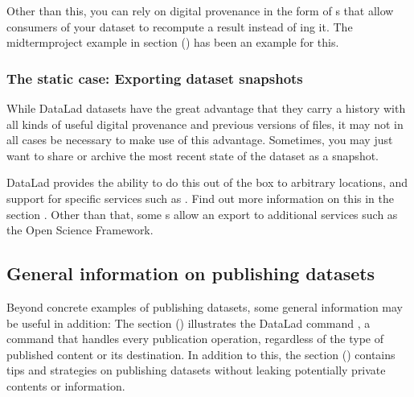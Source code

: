 \sphinxAtStartPar
Other than this, you can rely on digital provenance in the form of {\hyperref[\detokenize{glossary:term-run-record}]{}}s that allow consumers of your dataset to recompute a result instead of ing it.
The midterm\sphinxhyphen{}project example in section {\hyperref[\detokenize{basics/101-130-yodaproject:yoda-project}]{}} () has been an example for this.


\subsubsection{The static case: Exporting dataset snapshots}
\label{\detokenize{basics/101-138-sharethirdparty:the-static-case-exporting-dataset-snapshots}}
\sphinxAtStartPar
While DataLad datasets have the great advantage that they carry a history with all kinds of useful digital provenance and previous versions of files, it may not in all cases be necessary to make use of this advantage.
Sometimes, you may just want to share or archive the most recent state of the dataset as a snapshot.

\sphinxAtStartPar
DataLad provides the ability to do this out of the box to arbitrary locations, and support for specific services such as .
Find out more information on this in the section .
Other than that, some {\hyperref[\detokenize{glossary:term-DataLad-extension}]{}}s allow an export to additional services such as the Open Science Framework.


\subsection{General information on publishing datasets}
\label{\detokenize{basics/101-138-sharethirdparty:general-information-on-publishing-datasets}}
\sphinxAtStartPar
Beyond concrete examples of publishing datasets, some general information may be useful in addition:
The section {\hyperref[\detokenize{basics/101-141-push:push}]{}} () illustrates the DataLad command , a command that handles every publication operation, regardless of the type of published content or its destination.
In addition to this, the section {\hyperref[\detokenize{basics/101-139-privacy:privacy}]{}} () contains tips and strategies on publishing datasets without leaking potentially private contents or information.

